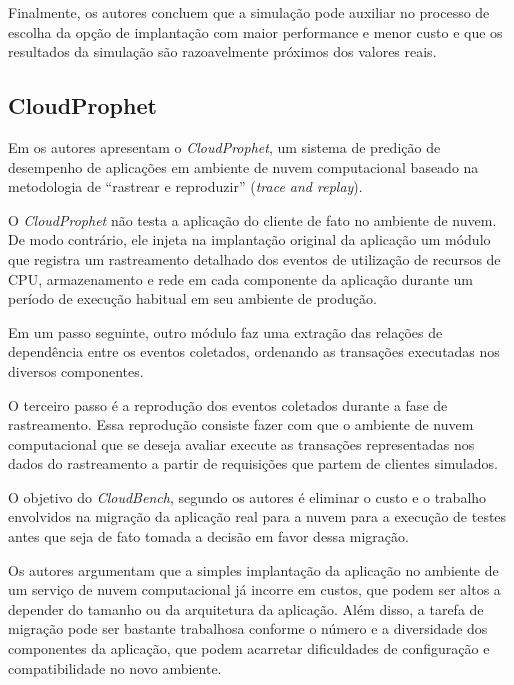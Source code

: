 Finalmente, os autores concluem que a simulação pode auxiliar no processo de escolha da opção de implantação com maior performance e menor custo e que os resultados da simulação são razoavelmente próximos dos valores reais.

\subsection{CloudProphet}\label{subsec:CloudProphet}
Em \cite{li2011cloudprophet} os autores apresentam o \textit{CloudProphet}, um sistema de
predição de desempenho de aplicações em ambiente de nuvem computacional baseado 
na metodologia de ``rastrear e reproduzir'' (\textit{trace and replay}).

O \textit{CloudProphet} não testa a aplicação do cliente de fato no ambiente de nuvem. De
modo contrário, ele injeta na implantação original da aplicação um módulo que 
registra um rastreamento detalhado dos eventos de utilização de recursos de CPU,
armazenamento e rede em cada componente da aplicação durante um período de 
execução habitual em seu ambiente de produção.

Em um passo seguinte, outro módulo faz uma extração das relações de dependência 
entre os eventos coletados, ordenando as transações executadas nos diversos 
componentes.

O terceiro passo é a reprodução dos eventos coletados durante a fase de 
rastreamento. Essa reprodução consiste fazer com que o ambiente de nuvem 
computacional que se deseja avaliar execute as transações representadas nos dados
do rastreamento a partir de requisições que partem de clientes simulados.
   
O objetivo do \textit{CloudBench}, segundo os autores é eliminar o custo e o trabalho 
envolvidos na migração da aplicação real para a nuvem para a execução de testes 
antes que seja de fato tomada a decisão em favor dessa migração.

Os autores argumentam que a simples implantação da aplicação no ambiente de um
serviço de nuvem computacional já incorre em custos, que podem ser altos a 
depender do tamanho ou da arquitetura da aplicação. Além disso, a tarefa de
migração pode ser bastante trabalhosa conforme o número e a diversidade dos 
componentes da aplicação, que podem acarretar dificuldades de configuração e
compatibilidade no novo ambiente.

